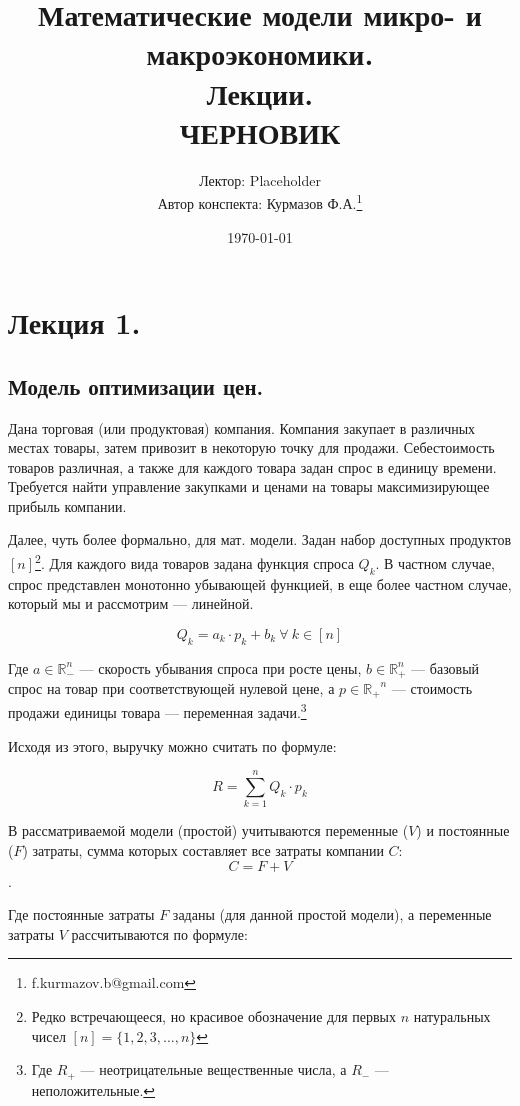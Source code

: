 \documentclass[reqno]{article}
\title{Математические модели микро- и макроэкономики.\\ Лекции.\\ ЧЕРНОВИК}
\author{Лектор: Placeholder\\ Автор конспекта: Курмазов Ф.А.\thanks{f.kurmazov.b@gmail.com}}
\date{\today}
\theoremstyle{definition}
\theoremstyle{definition}
\theoremstyle{definition}
\theoremstyle{definition}
\theoremstyle{definition}
\theoremstyle{definition}
\theoremstyle{definition}
\theoremstyle{definition}
\theoremstyle{definition}
\begin{document}
	\setlength{\parindent}{0pt}

	\maketitle

	\tableofcontents




	\newpage
	\section{Лекция 1.}
		\subsection{Модель оптимизации цен.}
			
			Дана торговая (или продуктовая) компания. Компания закупает в различных местах товары, затем привозит в некоторую точку для продажи. Себестоимость товаров различная, а также для каждого товара задан спрос в единицу времени. Требуется найти управление закупками и ценами на товары максимизирующее прибыль компании.\medskip
			
			Далее, чуть более формально, для мат. модели. Задан набор доступных продуктов $[n]$\footnote{Редко встречающееся, но красивое обозначение для первых $n$ натуральных чисел $[n] = \{1, 2, 3, ..., n\}$}. Для каждого вида товаров задана функция спроса $Q_k$. В частном случае, спрос представлен монотонно убывающей функцией, в еще более частном случае, который мы и рассмотрим --- линейной.

			$$Q_k = a_k\cdot p_k + b_k\ \forall\ k \in [n]$$

			Где $a \in \mathds{R}^n_-$ --- скорость убывания спроса при росте цены, $b \in \mathds{R}^n_+$ --- базовый спрос на товар при соответствующей нулевой цене, а  $p \in \mathds{R_+}^n$ --- стоимость продажи единицы товара --- переменная задачи.\footnote{Где $R_+$ --- неотрицательные вещественные числа, а $R_-$ --- неположительные.}
			
			Исходя из этого, выручку можно считать по формуле:

			$$R = \sum^n_{k=1} Q_k\cdot p_k$$	
			
			В рассматриваемой модели (простой) учитываются переменные ($V$) и постоянные ($F$) затраты, сумма которых составляет все затраты компании $C$:
			$$C = F + V$$.

			Где постоянные затраты $F$ заданы (для данной простой модели), а переменные затраты $V$ рассчитываются по формуле:
\end{document}
